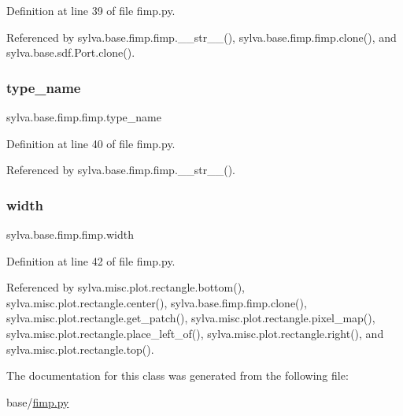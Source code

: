Definition at line 39 of file fimp.\+py.



Referenced by sylva.\+base.\+fimp.\+fimp.\+\_\+\+\_\+str\+\_\+\+\_\+(), sylva.\+base.\+fimp.\+fimp.\+clone(), and sylva.\+base.\+sdf.\+Port.\+clone().

\mbox{\label{classsylva_1_1base_1_1fimp_1_1fimp_a0eb962cbafd47c9f28ad2859d6a64de2}} 
\subsubsection{\texorpdfstring{type\+\_\+name}{type\_name}}
{\footnotesize\ttfamily sylva.\+base.\+fimp.\+fimp.\+type\+\_\+name}



Definition at line 40 of file fimp.\+py.



Referenced by sylva.\+base.\+fimp.\+fimp.\+\_\+\+\_\+str\+\_\+\+\_\+().

\mbox{\label{classsylva_1_1base_1_1fimp_1_1fimp_af63a637b7584ab0fcd1a7702e9ee9003}} 
\subsubsection{\texorpdfstring{width}{width}}
{\footnotesize\ttfamily sylva.\+base.\+fimp.\+fimp.\+width}



Definition at line 42 of file fimp.\+py.



Referenced by sylva.\+misc.\+plot.\+rectangle.\+bottom(), sylva.\+misc.\+plot.\+rectangle.\+center(), sylva.\+base.\+fimp.\+fimp.\+clone(), sylva.\+misc.\+plot.\+rectangle.\+get\+\_\+patch(), sylva.\+misc.\+plot.\+rectangle.\+pixel\+\_\+map(), sylva.\+misc.\+plot.\+rectangle.\+place\+\_\+left\+\_\+of(), sylva.\+misc.\+plot.\+rectangle.\+right(), and sylva.\+misc.\+plot.\+rectangle.\+top().



The documentation for this class was generated from the following file\+:\begin{DoxyCompactItemize}
\item 
base/\hyperlink{fimp_8py}{fimp.\+py}\end{DoxyCompactItemize}
